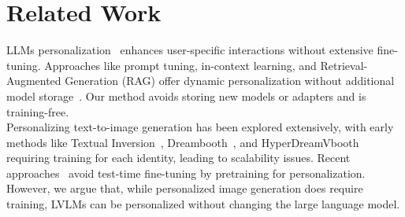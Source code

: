 \section{Related Work}
\vspace{-0.2cm}
\label{sec:related_work}
 LLMs personalization~\cite{zhang2024personalizationlargelanguagemodels} enhances user-specific interactions without extensive fine-tuning. Approaches like prompt tuning, in-context learning, and Retrieval-Augmented Generation (RAG) offer dynamic personalization without additional model storage~\cite{li2024matching, brown2020language, zollo2024personalllmtailoringllmsindividual}. Our method avoids storing new models or adapters and is training-free.\\
Personalizing text-to-image generation has been explored extensively, with early methods like Textual Inversion~\cite{gal2022image}, Dreambooth~\cite{ruiz2023dreambooth}, and HyperDreamVbooth~\cite{ruiz2024hyperdreambooth} requiring training for each identity, leading to scalability issues. Recent approaches~\cite{shi2024instantbooth,zeng2024jedi,he2024imagine} avoid test-time fine-tuning by pretraining for personalization. However,
we argue that, while personalized image generation does require training, LVLMs can be personalized without changing the large language model.\\

